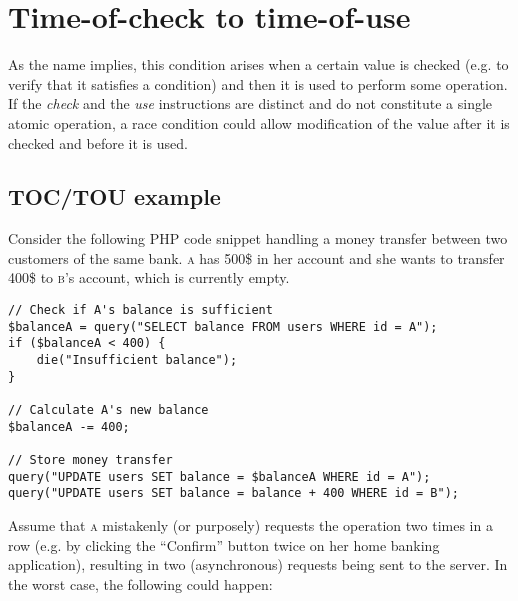 \section{Time-of-check to time-of-use}

As the name implies, this condition arises when a certain value is checked (e.g. to verify that it satisfies a condition) and then it is used to perform some operation. If the \textit{check} and the \textit{use} instructions are distinct and do not constitute a single atomic operation, a race condition could allow modification of the value after it is checked and before it is used.

\subsection{TOC/TOU example \citep{courseslides}}

Consider the following PHP code snippet handling a money transfer between two customers of the same bank. \textsc{a} has 500\$ in her account and she wants to transfer 400\$ to \textsc{b}'s account, which is currently empty.

\begin{verbatim}
// Check if A's balance is sufficient
$balanceA = query("SELECT balance FROM users WHERE id = A");
if ($balanceA < 400) {
    die("Insufficient balance");
}

// Calculate A's new balance
$balanceA -= 400;

// Store money transfer
query("UPDATE users SET balance = $balanceA WHERE id = A");
query("UPDATE users SET balance = balance + 400 WHERE id = B");
\end{verbatim}

Assume that \textsc{a} mistakenly (or purposely) requests the operation two times in a row (e.g. by clicking the ``Confirm'' button twice on her home banking application), resulting in two (asynchronous) requests being sent to the server. In the worst case, the following could happen:

